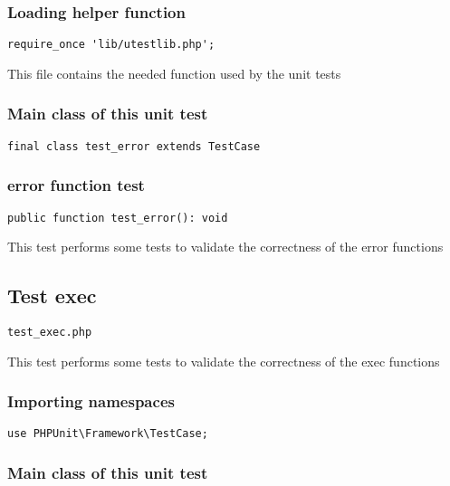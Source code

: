 \documentclass[a4paper]{article}
\begin{document}
\subsubsection{Loading helper function}

\begin{lstlisting}
require_once 'lib/utestlib.php';
\end{lstlisting}

This file contains the needed function used by the unit tests

\hypertarget{toc147}{}
\subsubsection{Main class of this unit test}

\begin{lstlisting}
final class test_error extends TestCase
\end{lstlisting}

\hypertarget{toc148}{}
\subsubsection{error function test}

\begin{lstlisting}
public function test_error(): void
\end{lstlisting}

This test performs some tests to validate the correctness
of the error functions

\hypertarget{toc149}{}
\subsection{Test exec}

\begin{lstlisting}
test_exec.php
\end{lstlisting}

This test performs some tests to validate the correctness
of the exec functions

\hypertarget{toc150}{}
\subsubsection{Importing namespaces}

\begin{lstlisting}
use PHPUnit\Framework\TestCase;
\end{lstlisting}

\hypertarget{toc151}{}
\subsubsection{Main class of this unit test}
\end{document}
